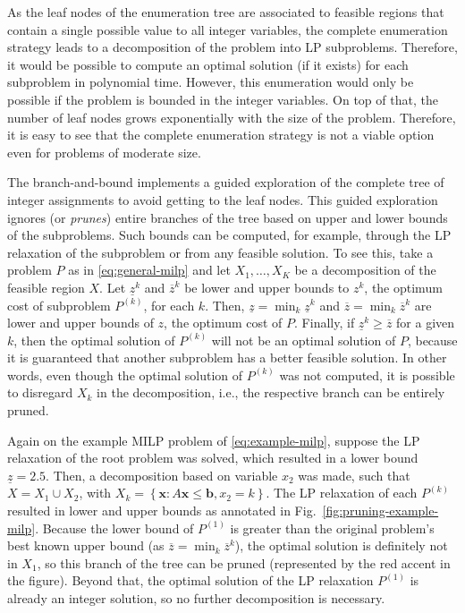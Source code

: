 As the leaf nodes of the enumeration tree are associated to feasible regions that contain a single possible value to all integer variables, the complete enumeration strategy leads to a decomposition of the problem into LP subproblems.
Therefore, it would be possible to compute an optimal solution (if it exists) for each subproblem in polynomial time.
However, this enumeration would only be possible if the problem is bounded in the integer variables.
On top of that, the number of leaf nodes grows exponentially with the size of the problem\footnotemark.
Therefore, it is easy to see that the complete enumeration strategy is not a viable option even for problems of moderate size.

The branch-and-bound implements a guided exploration of the complete tree of integer assignments to avoid getting to the leaf nodes.
This guided exploration ignores (or \emph{prunes}) entire branches of the tree based on upper and lower bounds of the subproblems.
Such bounds can be computed, for example, through the LP relaxation of the subproblem or from any feasible solution.
To see this, take a problem $P$ as in \eqref{eq:general-milp} and let $X_1,\ldots,X_K$ be a decomposition of the feasible region $X$.
Let $\underline{z}^{k}$ and $\overline{z}^{k}$ be lower and upper bounds to $z^{k}$, the optimum cost of subproblem $P^{(k)}$, for each $k$.
Then, $\underline{z}=\min_k \underline{z}^{k}$ and $\overline{z}=\min_k \overline{z}^{k}$ are lower and upper bounds of $z$, the optimum cost of $P$.
Finally, if $\underline{z}^{k} \ge \overline{z}$ for a given $k$, then the optimal solution of $P^{(k)}$ will not be an optimal solution of $P$, because it is guaranteed that another subproblem has a better feasible solution.
In other words, even though the optimal solution of $P^{(k)}$ was not computed, it is possible to disregard $X_k$ in the decomposition, i.e., the respective branch can be entirely pruned. 

Again on the example MILP problem of \eqref{eq:example-milp}, suppose the LP relaxation of the root problem was solved, which resulted in a lower bound $\underline{z}=2.5$.
Then, a decomposition based on variable $x_2$ was made, such that $X=X_1\cup X_2$, with $X_k = \left\{ \bm{x} : A\bm{x}\le \bm{b}, x_2 = k \right\}$.
The LP relaxation of each $P^{(k)}$ resulted in lower and upper bounds as annotated in Fig.~\ref{fig:pruning-example-milp}.
Because the lower bound of $P^{(1)}$ is greater than the original problem's best known upper bound (as $\overline{z}=\min_k \overline{z}^{k}$), the optimal solution is definitely not in $X_1$, so this branch of the tree can be pruned (represented by the red accent in the figure).
Beyond that, the optimal solution of the LP relaxation $P^{(1)}$ is already an integer solution, so no further decomposition is necessary. 


